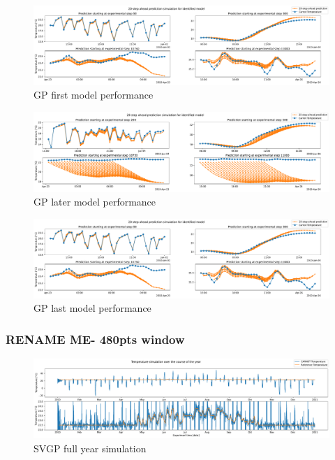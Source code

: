 \begin{figure}[ht]
    \centering
    \includegraphics[width =
    \textwidth]{Plots/1_SVGP_480pts_inf_window_12_averageYear_first_model_performance.pdf}
    \caption{GP first model performance}
    \label{fig:SVGP_first_model_performance}
\end{figure}

\begin{figure}[ht]
    \centering
    \includegraphics[width =
    \textwidth]{Plots/1_SVGP_480pts_inf_window_12_averageYear_later_model_performance.pdf}
    \caption{GP later model performance}
    \label{fig:SVGP_later_model_performance}
\end{figure}

\begin{figure}[ht]
    \centering
    \includegraphics[width =
    \textwidth]{Plots/1_SVGP_480pts_inf_window_12_averageYear_last_model_performance.pdf}
    \caption{GP last model performance}
    \label{fig:SVGP_last_model_performance}
\end{figure}

\clearpage

\subsubsection{RENAME ME- 480pts window}

\begin{figure}[ht]
    \centering
    \includegraphics[width =
    \textwidth]{Plots/5_SVGP_480pts_480pts_window_12_averageYear_fullyear.pdf}
    \caption{SVGP full year simulation}
    \label{fig:SVGP_480window_fullyear_simulation}
\end{figure}

